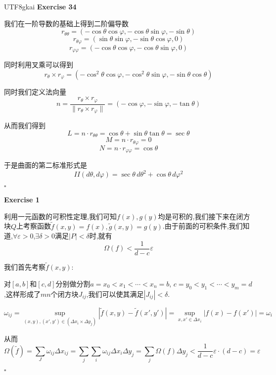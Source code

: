 \documentclass[11pt,hyperref,a4paper,UTF8]{ctexart}
\newenvironment{exercise}[1]{%
{\textbf{Exercise #1} \\ 
    }
}{
  \hfill $\square$ 
  \par\bigskip 
}
\begin{document}
\begin{CJK}{UTF8}{gkai}
\begin{exercise}{34}
    我们在一阶导数的基础上得到二阶偏导数
    \[r_{\theta\theta} = (-\cos \theta \cos \varphi, - \cos \theta \sin \varphi,- \sin \theta)\]
    \[r_{\theta\varphi} = (\sin \theta \sin \varphi, - \sin \theta \cos \varphi, 0)\]
    \[r_{\varphi\varphi} = (-\cos \theta \cos \varphi, - \cos \theta \sin \varphi, 0)\]

    同时利用叉乘可以得到
    \[r_\theta \times r_\varphi = (-\cos^2 \theta \cos \varphi, - \cos^2 \theta \sin \varphi, - \sin \theta \cos \theta)\]

    同时我们定义法向量
    \[n = \frac{r_\theta \times r_\varphi}{\|r_\theta \times r_\varphi\|} = (-\cos \varphi, - \sin\varphi, - \tan \theta)\]
    
    从而我们得到
    \[L = n \cdot r_{\theta\theta} = \cos \theta + \sin \theta \tan \theta = \sec \theta\]
    \[M = n \cdot r_{\theta\varphi} = 0\]
    \[N = n \cdot r_{\varphi\varphi} = \cos \theta\]

    于是曲面的第二标准形式是
    \[II(d\theta,d\varphi) = \sec \theta\,d\theta^2 + \cos \theta\, d \varphi^2\]
\end{exercise}
\begin{exercise}{1}


利用一元函数的可积性定理,我们可知$f(x),g(y)$均是可积的,我们接下来在闭方块$Q$上考察函数$\tilde{f}(x,y) = f(x),\tilde{g}(x,y) = g(y)$.由于前面的可积条件,我们知道,$\forall \varepsilon > 0$,$\exists \delta > 0$满足$|P| < \delta$时,就有
\[\Omega(f) < \frac{1}{d - c}\varepsilon\]

我们首先考察$\tilde{f}(x,y)$:

对$[a,b]$和$[c,d]$分别做分割$a = x_0 < x_1 < \cdots < x_n = b$, $c = y_0 < y_1 < \cdots < y_m = d$,这样形成了$mn$个闭方块$J_{ij}$,我们可以使其满足$|J_{ij}| < \delta$.

\[\omega_{ij} = \sup_{(x,y),(x',y') \in (\Delta x_i \times \Delta y_j)}\left|\tilde{f}(x,y) - \tilde{f}(x',y')\right| = \sup_{x,x' \in \Delta x_i}\left| f(x) - f(x')\right| = \omega_i\]

从而
\[\Omega(\tilde{f}) = \sum_{J} \omega_{ij}\Delta x_{ij} = \sum_{j} \sum_{i} \omega_{ij}\Delta x_{i} \Delta y_{j} =  \sum_{j} \Omega(f)\Delta y_{j} < \frac{1}{d - c}\varepsilon \cdot (d - c) = \varepsilon\]


\end{exercise}
\end{CJK}
\end{document}
